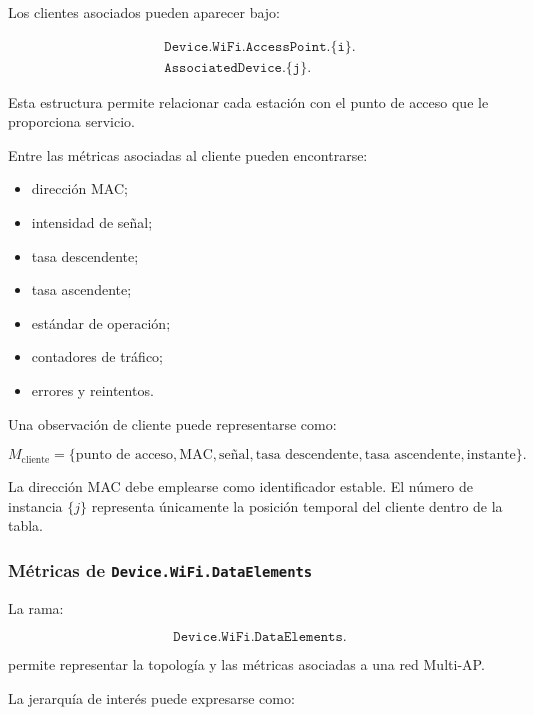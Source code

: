 Los clientes asociados pueden aparecer bajo:

\[
\begin{split}
    \texttt{Device.WiFi.AccessPoint.\{i\}.}\\
    \texttt{AssociatedDevice.\{j\}.}
\end{split}
\]

Esta estructura permite relacionar cada estación con el punto de acceso
que le proporciona servicio.

Entre las métricas asociadas al cliente pueden encontrarse:

\begin{itemize}
    \item dirección MAC;

    \item intensidad de señal;

    \item tasa descendente;

    \item tasa ascendente;

    \item estándar de operación;

    \item contadores de tráfico;

    \item errores y reintentos.
\end{itemize}

Una observación de cliente puede representarse como:

\[
    M_{\mathrm{cliente}}
    =
    \{
        \text{punto de acceso},
        \text{MAC},
        \text{señal},
        \text{tasa descendente},
        \text{tasa ascendente},
        \text{instante}
    \}.
\]

La dirección MAC debe emplearse como identificador estable. El número de
instancia \(\{j\}\) representa únicamente la posición temporal del
cliente dentro de la tabla.


\subsubsection*{Métricas de \texttt{Device.WiFi.DataElements}}

La rama:

\[
    \texttt{Device.WiFi.DataElements.}
\]

permite representar la topología y las métricas asociadas a una red
Multi-AP.

La jerarquía de interés puede expresarse como:


